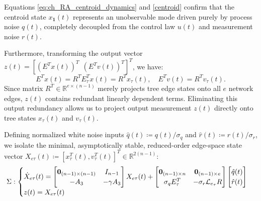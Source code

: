 Equations \eqref{eq:ch_RA_centroid_dynamics} and \eqref{centroid} confirm that the centroid state $x_\mathbf{1}(t)$ represents an unobservable mode driven purely by process noise $q(t)$, completely decoupled from the control law $u(t)$ and measurement noise $r(t)$.

Furthermore, transforming the output vector $z(t) = [(E^T x(t))^T~~ (E^T v(t))^T]^T$, we have:
\begin{equation}
	E^T x(t) = R^T E_\tau^T x(t) = R^T x_\tau(t), \quad E^T v(t) = R^T v_\tau(t).
\end{equation}
Since matrix $R^T \in \mathbb{R}^{e \times (n-1)}$ merely projects tree edge states onto all $e$ network edges, $z(t)$ contains redundant linearly dependent terms. Eliminating this output redundancy allows us to project output measurement $z(t)$ directly onto tree states $x_\tau(t)$ and $v_\tau(t)$.

Defining normalized white noise inputs $\hat{q}(t) \coloneqq q(t)/\sigma_q$ and $\hat{r}(t) \coloneqq r(t)/\sigma_r$, we isolate the minimal, asymptotically stable, reduced-order edge-space state vector $X_{e\tau}(t) \coloneqq [x_\tau^T(t), v_\tau^T(t)]^T \in \mathbb{R}^{2(n-1)}$:
\begin{equation}\label{eq:ch_RA_minimal_system_explicit}
	\Sigma: \begin{cases}
		\dot{X}_{e\tau}(t) = \begin{bmatrix} \mathbf{0}_{(n-1) \times (n-1)} & I_{n-1} \\ -A_3 & -\gamma A_3 \end{bmatrix} X_{e\tau}(t) + \begin{bmatrix} \mathbf{0}_{(n-1) \times n} & \mathbf{0}_{(n-1) \times e} \\ \sigma_q E_\tau^T & -\sigma_r \mathcal{L}_{e_{\tau}} R \end{bmatrix} \begin{bmatrix} \hat{q}(t) \\ \hat{r}(t) \end{bmatrix} \\
		z(t) = X_{e\tau}(t)
	\end{cases}
\end{equation}

